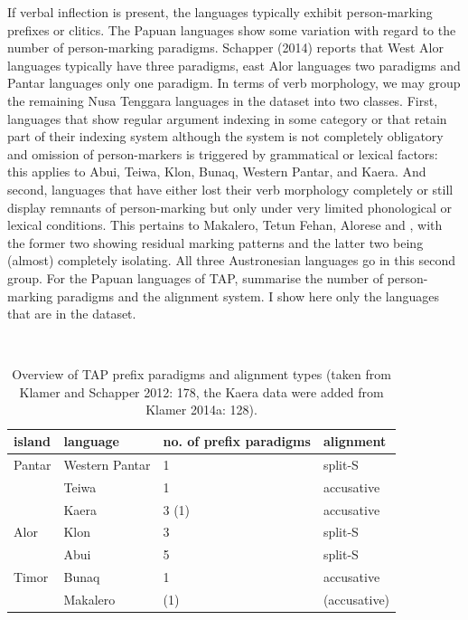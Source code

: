 If verbal inflection is present, the languages typically exhibit person-marking prefixes or clitics. The Papuan languages show some variation with regard to the number of person-marking paradigms. Schapper (2014) reports that West Alor languages typically have three paradigms, east Alor languages two paradigms and Pantar languages only one paradigm. In terms of verb morphology, we may group the remaining Nusa Tenggara languages in the dataset into two classes. First,  languages that show regular argument indexing in some category or that retain part of their indexing system although the system is not completely obligatory and omission of person-markers is triggered by grammatical or lexical factors: this applies to Abui, Teiwa, Klon, Bunaq, Western Pantar, and Kaera. And second, languages that have either lost their verb morphology completely or still display remnants of person-marking but only under very limited phonological or lexical conditions. This pertains to Makalero, Tetun Fehan, Alorese and , with the former two showing residual marking patterns and the latter two being (almost) completely isolating. All three Austronesian languages go in this second group. For the Papuan languages of TAP, \textcite{klamer2012development} summarise the number of person-marking paradigms and the alignment system. I show here only the languages that are in the dataset.

\
\begin{table}
\begin{center}
\begin{footnotesize}
\begin{tabular}{l l l l}
\hline\hline
island & language & no. of prefix paradigms & alignment \tabularnewline
\hline
Pantar & Western Pantar & 1 & split-S \tabularnewline
 & Teiwa & 1 & accusative \tabularnewline
 & Kaera & 3 (1) & accusative \tabularnewline
 Alor & Klon & 3 & split-S \tabularnewline
 & Abui & 5 & split-S \tabularnewline
 Timor & Bunaq & 1 & accusative \tabularnewline
 & Makalero & (1) & (accusative) \tabularnewline
\hline
\end{tabular}
\caption[Overview of TAP prefix paradigms and alignment types]{Overview of TAP prefix paradigms and alignment types (taken from Klamer and Schapper 2012: 178, the Kaera data were added from Klamer 2014a: 128).}
\label{table:TAPprefixalign}
\end{footnotesize}
\end{center}
\end{table}
\

